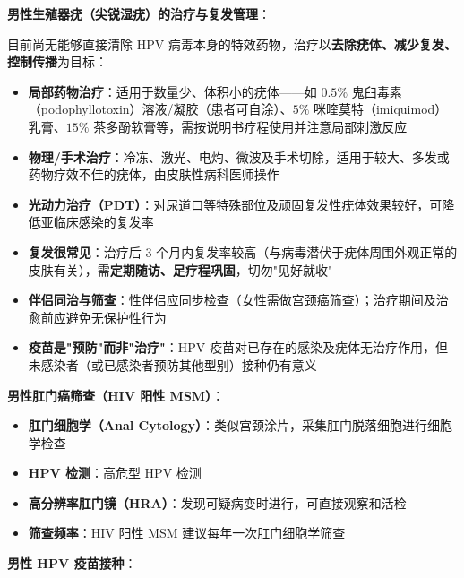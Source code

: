 \documentclass[12pt,a4paper,twoside]{ctexbook}
\begin{document}
\vspace{0.5em}
\noindent\textbf{男性生殖器疣（尖锐湿疣）的治疗与复发管理}：

目前尚无能够直接清除 HPV 病毒本身的特效药物，治疗以\textbf{去除疣体、减少复发、控制传播}为目标：

\begin{itemize}
	\item \textbf{局部药物治疗}：适用于数量少、体积小的疣体——如 $0.5\%$ 鬼臼毒素（podophyllotoxin）溶液/凝胶（患者可自涂）、$5\%$ 咪喹莫特（imiquimod）乳膏、$15\%$ 茶多酚软膏等，需按说明书疗程使用并注意局部刺激反应
	\item \textbf{物理/手术治疗}：冷冻、激光、电灼、微波及手术切除，适用于较大、多发或药物疗效不佳的疣体，由皮肤性病科医师操作
	\item \textbf{光动力治疗（PDT）}：对尿道口等特殊部位及顽固复发性疣体效果较好，可降低亚临床感染的复发率
	\item \textbf{复发很常见}：治疗后 $3$ 个月内复发率较高（与病毒潜伏于疣体周围外观正常的皮肤有关），需\textbf{定期随访、足疗程巩固}，切勿"见好就收"
	\item \textbf{伴侣同治与筛查}：性伴侣应同步检查（女性需做宫颈癌筛查）；治疗期间及治愈前应避免无保护性行为
	\item \textbf{疫苗是"预防"而非"治疗"}：HPV 疫苗对已存在的感染及疣体无治疗作用，但未感染者（或已感染者预防其他型别）接种仍有意义
\end{itemize}

\vspace{0.5em}
\noindent\textbf{男性肛门癌筛查（HIV 阳性 MSM）}：

\begin{itemize}[leftmargin=2cm]
	\item \textbf{肛门细胞学（Anal Cytology）}：类似宫颈涂片，采集肛门脱落细胞进行细胞学检查
	\item \textbf{HPV 检测}：高危型 HPV 检测
	\item \textbf{高分辨率肛门镜（HRA）}：发现可疑病变时进行，可直接观察和活检
	\item \textbf{筛查频率}：HIV 阳性 MSM 建议每年一次肛门细胞学筛查
\end{itemize}

\vspace{0.5em}
\noindent\textbf{男性 HPV 疫苗接种}：
\end{document}
